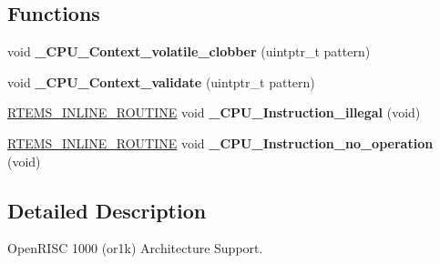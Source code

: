 \subsection*{Functions}
\begin{DoxyCompactItemize}
\item 
\mbox{\label{group__RTEMSScoreCPUor1k_gad26becade17fbdbb0bdf63c6b9228688}} 
void {\bfseries \+\_\+\+C\+P\+U\+\_\+\+Context\+\_\+volatile\+\_\+clobber} (uintptr\+\_\+t pattern)
\item 
\mbox{\label{group__RTEMSScoreCPUor1k_ga3adb94b8d32fd0e3058934ffd3df6d90}} 
void {\bfseries \+\_\+\+C\+P\+U\+\_\+\+Context\+\_\+validate} (uintptr\+\_\+t pattern)
\item 
\mbox{\label{group__RTEMSScoreCPUor1k_ga07618c93359f2485af2e98a96b330208}} 
\mbox{\hyperlink{group__RTEMSScoreBaseDefs_gac216239df231d5dbd15e3520b0b9313f}{R\+T\+E\+M\+S\+\_\+\+I\+N\+L\+I\+N\+E\+\_\+\+R\+O\+U\+T\+I\+NE}} void {\bfseries \+\_\+\+C\+P\+U\+\_\+\+Instruction\+\_\+illegal} (void)
\item 
\mbox{\label{group__RTEMSScoreCPUor1k_gab683a0a37a089e2a0fd3c356836d5499}} 
\mbox{\hyperlink{group__RTEMSScoreBaseDefs_gac216239df231d5dbd15e3520b0b9313f}{R\+T\+E\+M\+S\+\_\+\+I\+N\+L\+I\+N\+E\+\_\+\+R\+O\+U\+T\+I\+NE}} void {\bfseries \+\_\+\+C\+P\+U\+\_\+\+Instruction\+\_\+no\+\_\+operation} (void)
\end{DoxyCompactItemize}


\subsection{Detailed Description}
Open\+R\+I\+SC 1000 (or1k) Architecture Support. 

